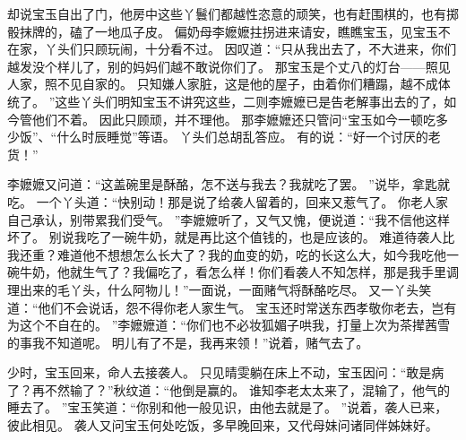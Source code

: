 却说宝玉自出了门，他房中这些丫鬟们都越性恣意的顽笑，也有赶围棋的，也有掷骰抹牌的，磕了一地瓜子皮。
偏奶母李嬷嬷拄拐进来请安，瞧瞧宝玉，见宝玉不在家，丫头们只顾玩闹，十分看不过。
因叹道：“只从我出去了，不大进来，你们越发没个样儿了，别的妈妈们越不敢说你们了。
那宝玉是个丈八的灯台——照见人家，照不见自家的。
只知嫌人家脏，这是他的屋子，由着你们糟蹋，越不成体统了。
”这些丫头们明知宝玉不讲究这些，二则李嬷嬷已是告老解事出去的了，如今管他们不着。
因此只顾顽，并不理他。
那李嬷嬷还只管问“宝玉如今一顿吃多少饭”、“什么时辰睡觉”等语。
丫头们总胡乱答应。
有的说：“好一个讨厌的老货！”\par
李嬷嬷又问道：“这盖碗里是酥酪，怎不送与我去？我就吃了罢。
”说毕，拿匙就吃。
一个丫头道：“快别动！那是说了给袭人留着的，回来又惹气了。
你老人家自己承认，别带累我们受气。
”李嬷嬷听了，又气又愧，便说道：“我不信他这样坏了。
别说我吃了一碗牛奶，就是再比这个值钱的，也是应该的。
难道待袭人比我还重？难道他不想想怎么长大了？我的血变的奶，吃的长这么大，如今我吃他一碗牛奶，他就生气了？我偏吃了，看怎么样！你们看袭人不知怎样，那是我手里调理出来的毛丫头，什么阿物儿！”一面说，一面赌气将酥酪吃尽。
又一丫头笑道：“他们不会说话，怨不得你老人家生气。
宝玉还时常送东西孝敬你老去，岂有为这个不自在的。
”李嬷嬷道：“你们也不必妆狐媚子哄我，打量上次为茶撵茜雪的事我不知道呢。
明儿有了不是，我再来领！”说着，赌气去了。
\par
少时，宝玉回来，命人去接袭人。
只见晴雯躺在床上不动，宝玉因问：“敢是病了？再不然输了？”秋纹道：“他倒是赢的。
谁知李老太太来了，混输了，他气的睡去了。
”宝玉笑道：“你别和他一般见识，由他去就是了。
”说着，袭人已来，彼此相见。
袭人又问宝玉何处吃饭，多早晚回来，又代母妹问诸同伴姊妹好。
